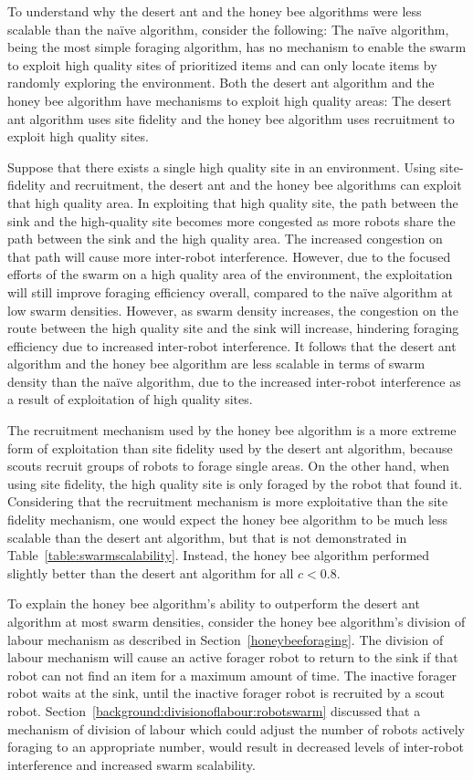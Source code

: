 To understand why the desert ant and the honey bee algorithms were less scalable than the na\"ive algorithm, consider the following: The na\"ive algorithm, being the most simple foraging algorithm, has no mechanism to enable the swarm to exploit high quality sites of prioritized items and can only locate items by randomly exploring the environment. Both the desert ant algorithm and the honey bee algorithm have mechanisms to exploit high quality areas: The desert ant algorithm uses site fidelity and the honey bee algorithm uses recruitment to exploit high quality sites. 

Suppose that there exists a single high quality site in an environment. Using site-fidelity and recruitment, the desert ant and the honey bee algorithms can exploit that high quality area. In exploiting that high quality site, the path between the sink and the high-quality site becomes more congested as more robots share the path between the sink and the high quality area. The increased congestion on that path will cause more inter-robot interference. However, due to the focused efforts of the swarm on a high quality area of the environment, the exploitation will still improve foraging efficiency overall, compared to the na\"ive algorithm at low swarm densities. However, as swarm density increases, the congestion on the route between the high quality site and the sink will increase, hindering foraging efficiency due to increased inter-robot interference. It follows that the desert ant algorithm and the honey bee algorithm are less scalable in terms of swarm density than the na\"ive algorithm, due to the increased inter-robot interference as a result of exploitation of high quality sites.

The recruitment mechanism used by the honey bee algorithm is a more extreme form of exploitation than site fidelity used by the desert ant algorithm, because scouts recruit groups of robots to forage single areas. On the other hand, when using site fidelity, the high quality site is only foraged by the robot that found it. Considering that the recruitment mechanism is more exploitative than the site fidelity mechanism, one would expect the honey bee algorithm to be much less scalable than the desert ant algorithm, but that is not demonstrated in Table~\ref{table:swarmscalability}. Instead, the honey bee algorithm performed slightly better than the desert ant algorithm for all $c < 0.8$.

To explain the honey bee algorithm's ability to outperform the desert ant algorithm at most swarm densities, consider the honey bee algorithm's division of labour mechanism as described in Section~\ref{honeybeeforaging}. The division of labour mechanism will cause an active forager robot to return to the sink if that robot can not find an item for a maximum amount of time. The inactive forager robot waits at the sink, until the inactive forager robot is recruited by a scout robot. Section~\ref{background:divisionoflabour:robotswarm} discussed that a mechanism of division of labour which could adjust the number of robots actively foraging to an appropriate number, would result in decreased levels of inter-robot interference and increased swarm scalability.

